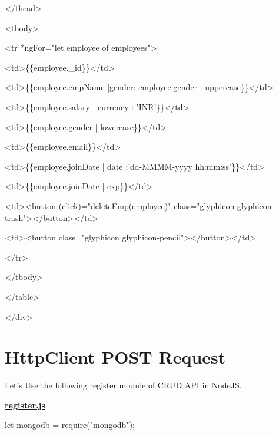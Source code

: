 \documentclass[11pt,twoside]{article}
\begin{document}
  \hspace*{10}</thead>

  \hspace*{10}<tbody>

  \hspace*{10}<tr *ngFor="let employee of employees">

  \hspace*{20}<td>\{\{employee.\_id\}\}</td>

  \hspace*{20}<td>\{\{employee.empName |gender: employee.gender | uppercase\}\}</td> 

  \hspace*{20}<td>\{\{employee.salary | currency : 'INR'\}\}</td>

  \hspace*{20}<td>\{\{employee.gender | lowercase\}\}</td>

  \hspace*{20}<td>\{\{employee.email\}\}</td>

  \hspace*{20}<td>\{\{employee.joinDate | date :'dd-MMMM-yyyy hh:mm:ss'\}\}</td>

  \hspace*{20}<td>\{\{employee.joinDate | exp\}\}</td>

  \hspace*{20}<td><button (click)="deleteEmp(employee)" class="glyphicon glyphicon-trash"></button></td> 

  \hspace*{20}<td><button class="glyphicon glyphicon-pencil"></button></td>

  \hspace*{10}</tr> 

  \hspace*{10}</tbody>

</table>

</div>

\vspace{16\baselineskip}
\section*{HttpClient POST Request}

\vspace{1\baselineskip}
Let's Use the following register module of CRUD API in NodeJS.

\vspace{1\baselineskip}
\textbf{\uline{register.js}}

\vspace{1\baselineskip}
let mongodb = require("mongodb");
\end{document}

